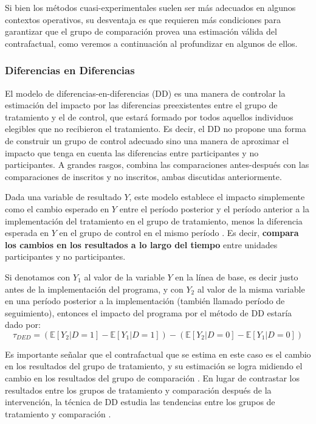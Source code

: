 \documentclass[../../main.tex]{subfiles}
\begin{document}
Si bien los métodos cuasi-experimentales suelen ser más adecuados en algunos contextos operativos, su desventaja es que requieren más condiciones para garantizar que el grupo de comparación provea una estimación válida del contrafactual, como veremos a continuación al profundizar en algunos de ellos.

\subsubsection{Diferencias en Diferencias}
El modelo de diferencias-en-diferencias (DD) es una manera de controlar la estimación del impacto por las diferencias preexistentes entre el grupo de tratamiento y el de control, que estará formado por todos aquellos individuos elegibles que no recibieron el tratamiento. Es decir, el DD no propone una forma de construir un grupo de control adecuado sino una manera de aproximar el impacto que tenga en cuenta las diferencias entre participantes y no participantes. A grandes rasgos, combina las comparaciones antes-después con las comparaciones de inscritos y no inscritos, ambas discutidas anteriormente. 

Dada una variable de resultado \(Y\), este modelo establece el impacto simplemente como el cambio esperado en \(Y\) entre el período posterior y el período anterior a la implementación del tratamiento en el grupo de tratamiento, menos la diferencia esperada en \(Y\) en el grupo de control en el mismo período \cite{bernal}. Es decir, \textbf{compara los cambios en los resultados a lo largo del tiempo} entre unidades participantes y no participantes. 

Si denotamos con \(Y_1\) al valor de la variable \(Y\) en la línea de base, es decir justo antes de la implementación del programa, y con \(Y_2\) al valor de la misma variable en una período posterior a la implementación (también llamado período de seguimiento), entonces el impacto del programa por el método de DD estaría dado por:
\begin{equation}
    \tau_{DED} = 
        \left(
            \mathbb{E}\left[Y_2|D=1\right] - \mathbb{E}\left[Y_1|D=1\right]
        \right) -
        \left(
            \mathbb{E}\left[Y_2|D=0\right] - \mathbb{E}\left[Y_1|D=0\right]
        \right)
        \label{eq:dif-en-dif-1}
\end{equation}

Es importante señalar que el contrafactual que se estima en este caso es el cambio en los resultados del grupo de tratamiento, y su estimación se logra midiendo el cambio en los resultados del grupo de comparación \cite{gertler-2016}. En lugar de contrastar los resultados entre los grupos de tratamiento y comparación después de la intervención, la técnica de DD estudia las tendencias entre los grupos de tratamiento y comparación \cite{gertler-2016}.
\end{document}
